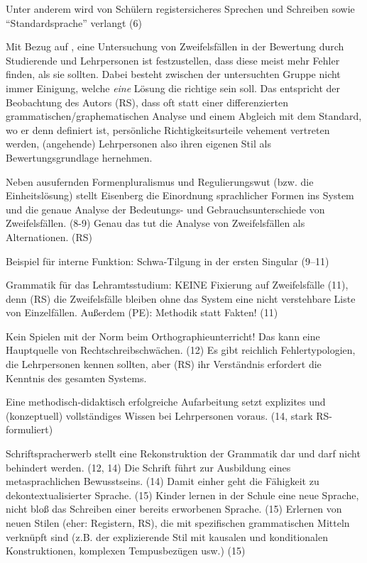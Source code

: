 Unter anderem wird von Schülern registersicheres Sprechen und Schreiben sowie "`Standardsprache"' verlangt (6)

Mit Bezug auf \citet{Braun1979}, eine Untersuchung von Zweifelsfällen in der Bewertung durch Studierende und Lehrpersonen ist festzustellen, dass diese meist mehr Fehler finden, als sie sollten.
Dabei besteht zwischen der untersuchten Gruppe nicht immer Einigung, welche \textit{eine} Lösung die richtige sein soll.
Das entspricht der Beobachtung des Autors (RS), dass oft statt einer differenzierten grammatischen\slash graphematischen Analyse und einem Abgleich mit dem Standard, wo er denn definiert ist, persönliche Richtigkeitsurteile vehement vertreten werden, (angehende) Lehrpersonen also ihren eigenen Stil als Bewertungsgrundlage hernehmen.

Neben ausufernden Formenpluralismus und Regulierungswut (bzw. die Einheitslösung) stellt Eisenberg die Einordnung sprachlicher Formen ins System und die genaue Analyse der Bedeutungs- und Gebrauchsunterschiede von Zweifelsfällen. (8-9) Genau das tut die Analyse von Zweifelsfällen als Alternationen. (RS)

Beispiel für interne Funktion: Schwa-Tilgung in der ersten Singular (9--11)

Grammatik für das Lehramtsstudium: KEINE Fixierung auf Zweifelsfälle (11), denn (RS) die Zweifelsfälle bleiben ohne das System eine nicht verstehbare Liste von Einzelfällen. Außerdem (PE): Methodik statt Fakten! (11)

Kein Spielen mit der Norm beim Orthographieunterricht! Das kann eine Hauptquelle von Rechtschreibschwächen. (12) Es gibt reichlich Fehlertypologien, die Lehrpersonen kennen sollten, aber (RS) ihr Verständnis erfordert die Kenntnis des gesamten Systems.

Eine methodisch-didaktisch erfolgreiche Aufarbeitung setzt explizites und (konzeptuell) vollständiges Wissen bei Lehrpersonen voraus. (14, stark RS-formuliert)

Schriftspracherwerb stellt eine Rekonstruktion der Grammatik dar und darf nicht behindert werden. (12, 14)
Die Schrift führt zur Ausbildung eines metasprachlichen Bewusstseins. (14)
Damit einher geht die Fähigkeit zu dekontextualisierter Sprache. (15)
Kinder lernen in der Schule eine neue Sprache, nicht bloß das Schreiben einer bereits erworbenen Sprache. (15)
Erlernen von neuen Stilen (eher: Registern, RS), die mit spezifischen grammatischen Mitteln verknüpft sind (z.B. der explizierende Stil mit kausalen und konditionalen Konstruktionen, komplexen Tempusbezügen usw.) (15)

